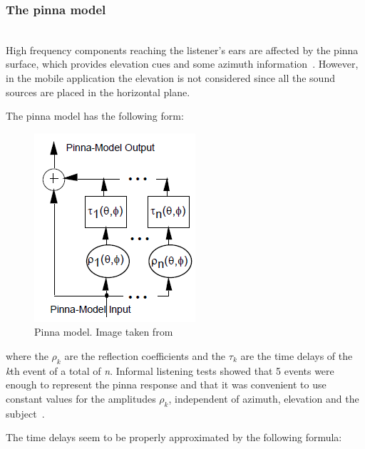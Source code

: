 \documentclass[journal]{IEEEtran}
\begin{document}

\subsubsection{The pinna model}~\\
High frequency components reaching the listener's ears are affected by the pinna surface, which provides elevation cues and some azimuth information~\cite{Brown1997}. However, in the mobile application the elevation is not considered since all the sound sources are placed in the horizontal plane. 

The pinna model has the following form:

\begin{figure}[h!]
  \centering
    \includegraphics[scale=0.75]{graphics/pinna_part.png}
  \caption{Pinna model. Image taken from~\cite{Brown1997}}
  \label{fig:pinnaModel}
\end{figure}


where the $\rho_{k}$ are the reflection coefficients and the $\tau_{k}$ are the time delays of the \textit{k}th event of a total of \textit{n}. Informal listening tests showed that 5 events were enough to represent the pinna response and that it was convenient to use constant values for the amplitudes $\rho_{k}$,  independent of azimuth, elevation and the subject~\cite{Brown1997}. 

The time delays seem to be properly approximated by the following formula:
\end{document}

